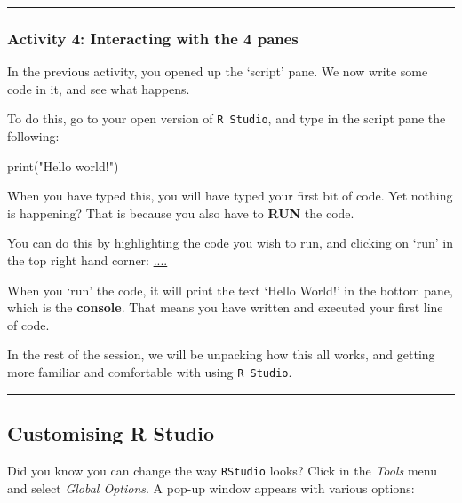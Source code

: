 \documentclass[
]{book}
\newenvironment{Shaded}{\begin{snugshade}}{\end{snugshade}}
\newcommand{\FunctionTok}[1]{\textcolor[rgb]{0.00,0.00,0.00}{#1}}
\newcommand{\NormalTok}[1]{#1}
\newcommand{\StringTok}[1]{\textcolor[rgb]{0.31,0.60,0.02}{#1}}
\begin{document}
\begin{center}\rule{0.5\linewidth}{0.5pt}\end{center}

\hypertarget{activity-4-interacting-with-the-4-panes}{%
\subsubsection{Activity 4: Interacting with the 4 panes}\label{activity-4-interacting-with-the-4-panes}}

In the previous activity, you opened up the `script' pane. We now write some code in it, and see what happens.

To do this, go to your open version of \texttt{R\ Studio}, and type in the script pane the following:

\begin{Shaded}
\begin{Highlighting}[]
\FunctionTok{print}\NormalTok{(}\StringTok{"Hello world!"}\NormalTok{)}
\end{Highlighting}
\end{Shaded}

When you have typed this, you will have typed your first bit of code. Yet nothing is happening? That is because you also have to \textbf{RUN} the code.

You can do this by highlighting the code you wish to run, and clicking on `run' in the top right hand corner:
\url{....}

When you `run' the code, it will print the text `Hello World!' in the bottom pane, which is the \textbf{console}. That means you have written and executed your first line of code.

In the rest of the session, we will be unpacking how this all works, and getting more familiar and comfortable with using \texttt{R\ Studio}.

\begin{center}\rule{0.5\linewidth}{0.5pt}\end{center}

\hypertarget{customising-r-studio}{%
\subsection{Customising R Studio}\label{customising-r-studio}}

Did you know you can change the way \texttt{RStudio} looks? Click in the \emph{Tools} menu and select \emph{Global Options}. A pop-up window appears with various options:
\end{document}

